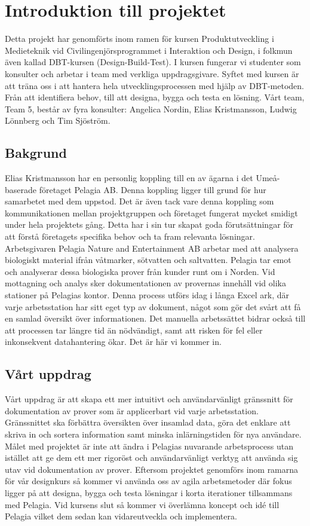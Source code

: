 \section{Introduktion till projektet}
Detta projekt har genomförts inom ramen för kursen Produktutveckling i Medieteknik vid Civilingenjörsprogrammet i Interaktion och Design, i folkmun även kallad DBT-kursen (Design-Build-Test). I kursen fungerar vi studenter som konsulter och arbetar i team med verkliga uppdragsgivare. Syftet med kursen är att träna oss i att hantera hela utvecklingsprocessen med hjälp av DBT-metoden. Från att identifiera behov, till att designa, bygga och testa en lösning. Vårt team, Team 5, består av fyra konsulter: Angelica Nordin, Elias Kristmansson, Ludwig Lönnberg och Tim Sjöström.

\subsection{Bakgrund}
Elias Kristmansson har en personlig koppling till en av ägarna i det Umeå-baserade företaget Pelagia AB. Denna koppling ligger till grund för hur samarbetet med dem uppstod. Det är även tack vare denna koppling som kommunikationen mellan projektgruppen och företaget fungerat mycket smidigt under hela projektets gång. Detta har i sin tur skapat goda förutsättningar för att förstå företagets specifika behov och ta fram relevanta lösningar. Arbetsgivaren Pelagia Nature and Entertainment AB arbetar med att analysera biologiskt material ifrån våtmarker, sötvatten och saltvatten. Pelagia tar emot och analyserar dessa biologiska prover från kunder runt om i Norden. Vid mottagning och analys sker dokumentationen av provernas innehåll vid olika stationer på Pelagias kontor. Denna process utförs idag i långa Excel ark, där varje arbetsstation har sitt eget typ av dokument, något som gör det svårt att få en samlad översikt över informationen. Det manuella arbetssättet bidrar också till att processen tar längre tid än nödvändigt, samt att risken för fel eller inkonsekvent datahantering ökar. Det är här vi kommer in.

\subsection{Vårt uppdrag}
Vårt uppdrag är att skapa ett mer intuitivt och användarvänligt gränssnitt för dokumentation av prover som är applicerbart vid varje arbetsstation. Gränssnittet ska förbättra översikten över insamlad data, göra det enklare att skriva in och sortera information samt minska inlärningstiden för nya användare. Målet med projektet är inte att ändra i Pelagias nuvarande arbetsprocess utan istället att ge dem ett mer rigoröst och användarvänligt verktyg att använda sig utav vid dokumentation av prover. Eftersom projektet genomförs inom ramarna för vår designkurs så kommer vi använda oss av agila arbetsmetoder där fokus ligger på att designa, bygga och testa lösningar i korta iterationer tillsammans med Pelagia. Vid kursens slut så kommer vi överlämna koncept och idé till Pelagia vilket dem sedan kan vidareutveckla och implementera. 